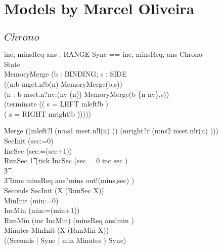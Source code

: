 \section{Models by Marcel Oliveira}

\subsection{$Chrono$}
\begin{circus}
\circchannel inc, minsReq
\also \circchannel ans : RANGE
\also \circchannelset Sync == \lchanset inc, minsReq, ans \rchanset
\also \circprocess Chrono \circdef\ \circbegin\\
\circstate State \\
MemoryMerge \circdef (\circvres b : BINDING; s : SIDE \circspot\\
((\Extchoice n:\dom b \circspot mget.n!b(n) \then MemoryMerge(b,s))\\
\extchoice (\Extchoice n : \dom b \circspot mset.n?nv:(nv \in \delta(n)) \then MemoryMerge(b \oplus \{n \mapsto nv\},s))\\
\extchoice (terminate \then (( \lcircguard s = LEFT \rcircguard \circguard mleft!b \then \Skip)\\\extchoice( \lcircguard s = RIGHT \rcircguard \circguard mright!b \then \Skip)))))

Merge \circdef ((mleft?l \then (\Semi n:ns1 \circspot mset.n!l(n) \then \Skip)) \interleave (mright?r \then (\Semi n:ns2 \circspot mset.n!r(n) \then \Skip)))\\
SecInit \circdef (sec:=0)\\
IncSec \circdef (sec:=(sec+1))\\
RunSec \circdef \t1
(tick \then IncSec \circseq
    (\circif  sec = 0 \circthen inc \then \Skip
    \circelse sec  \circthen \Skip \circfi)
  \\\t3 \extchoice\\
  \t3  time \then minsReq \then ans?mins \then out!(mins,sec)
      \then \Skip )  \\
Seconds \circdef SecInit \circseq (\circmu X \circspot (RunSec \circseq X))\\
MinInit \circdef (min:=0)\\
IncMin \circdef (min:=(min+1))\\
RunMin \circdef (inc \then IncMin) \extchoice (minsReq \then ans!min \then \Skip)\\
Minutes \circdef MinInit \circseq (\circmu X \circspot (RunMin \circseq X))\\
\circspot ((Seconds  | Sync | {min} \rpar Minutes ) \circhide Sync)\\
\circend
\end{circus}

